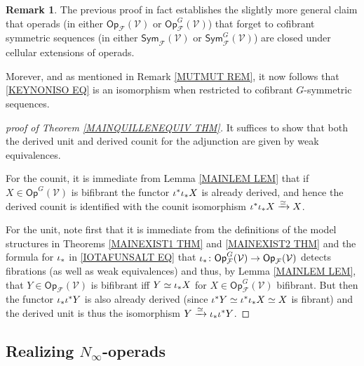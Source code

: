 \documentclass[a4paper,10pt
,draft
]{article}%
\numberwithin{equation}{section}
\numberwithin{figure}{section}
\theoremstyle{definition} %
\newtheorem{remark}[equation]{Remark}%
\newcommand{\1}{\ensuremath{\mathbbm 1}}%
\begin{document}
\begin{remark}
The previous proof in fact establishes 
the slightly more general claim that operads 
(in either 
$\mathsf{Op}_{\mathcal{F}}(\mathcal{V})$ or
$\mathsf{Op}_{\mathcal{F}}^G(\mathcal{V})$)
that forget to cofibrant symmetric sequences
(in either 
$\mathsf{Sym}_{\mathcal{F}}(\mathcal{V})$ or
$\mathsf{Sym}_{\mathcal{F}}^G(\mathcal{V})$)
are closed under cellular extensions of operads.

Morever, and as mentioned in Remark \ref{MUTMUT REM},
it now follows that \eqref{KEYNONISO EQ}
is an isomorphism when restricted to cofibrant $G$-symmetric sequences.
\end{remark}



\begin{proof}[proof of Theorem \ref{MAINQUILLENEQUIV THM}]
        It suffices to show that both the derived unit and derived counit for the adjunction are given by weak equivalences.

        For the counit, it is immediate from Lemma \ref{MAINLEM LEM} that if $X \in \mathsf{Op}^G(\mathcal{V})$ is bifibrant
        the functor $\iota^{\**} \iota_{\**} X$ is already derived, and hence the derived counit is identified with the counit isomorphism $\iota^{\**} \iota_{\**} X \xrightarrow{\simeq} X$.

        For the unit, note first that it is immediate from the definitions
        of the model structures in Theorems 
        \ref{MAINEXIST1 THM} and \ref{MAINEXIST2 THM} 
        and the formula for $\iota_{\**}$ in \eqref{IOTAFUNSALT EQ}
        that 
        $\iota_{\**} \colon 
        \mathsf{Op}^{G}_{\mathcal{F}}(\mathcal{V})\to  
       \mathsf{Op}_{\mathcal{F}}(\mathcal{V})$
        detects fibrations (as well as weak equivalences)
        and thus, by Lemma \ref{MAINLEM LEM},
        that 
        $Y \in \mathsf{Op}_{\mathcal{F}}(\mathcal{V})$
        is bifibrant iff $Y \simeq \iota_{\**} X$
        for $X \in \mathsf{Op}^{G}_{\mathcal{F}}(\mathcal{V})$ bifibrant.
        But then the functor $\iota_{\**} \iota^{\**} Y$ 
        is also already derived (since $\iota^{\**} Y \simeq \iota^{\**}\iota_{\**} X \simeq X$ is fibrant) and the derived unit is thus the isomorphism
        $Y \xrightarrow{\simeq} \iota_{\**} \iota^{\**} Y$.
\end{proof}



\subsection{Realizing $N_{\infty}$-operads}
\label{NINFTY_SECTION}
\end{document}
